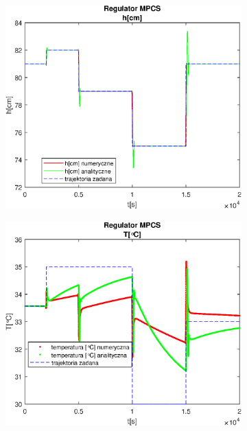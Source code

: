 \begin{figure}[h!]
   \centering
   \begin{subfigure}[b]{0.4\textwidth}
      \includegraphics[width=1\linewidth]{img/MPCSnumRK/MPCSRKHN50Nu10l20.eps}
      \caption{}
      \label{fig:fig:MPCSRKN50Nu10l201}
   \end{subfigure}
       
   \begin{subfigure}[b]{0.4\textwidth}
      \includegraphics[width=1\linewidth]{img/MPCSnumRK/MPCSRKTN50Nu10l20.eps}
      \caption{}
      \label{fig:fig:MPCSRKN50Nu10l202}
   \end{subfigure}
       

\end{figure}
